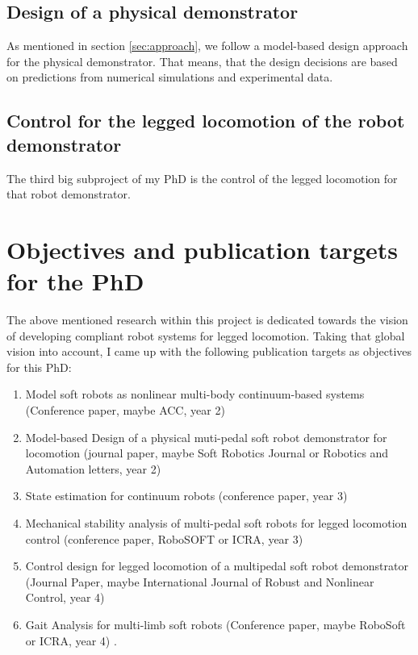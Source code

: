 \subsection*{Design of a physical demonstrator} \label{sub:Design}
%
As mentioned in section \ref{sec:approach}, we follow a model-based design approach for the physical demonstrator. That means, that the design decisions are based on predictions 
from numerical simulations and experimental data. 
%
\subsection*{Control for the legged locomotion of the robot demonstrator} \label{sub:Control}
%
The third big subproject of my PhD is the control of the legged locomotion for that robot demonstrator. 



\section{Objectives and publication targets for the PhD} \label{sec:objectives}
%
The above mentioned research within this project is dedicated towards the vision of developing compliant robot systems for legged locomotion. Taking that global vision into account,
I came up with the following publication targets as objectives for this PhD:

\begin{enumerate}
    \item Model soft robots as nonlinear multi-body continuum-based systems (Conference paper, maybe ACC, year 2) 
    \item Model-based Design of a physical muti-pedal soft robot demonstrator for locomotion  (journal paper, maybe Soft Robotics Journal or Robotics and Automation letters, year 2)
    \item State estimation for continuum robots (conference paper, year 3)
    \item Mechanical stability analysis of multi-pedal soft robots for legged locomotion control (conference paper, RoboSOFT or ICRA, year 3)
    \item Control design for legged locomotion of a multipedal soft robot demonstrator (Journal Paper, maybe International Journal of Robust and Nonlinear Control, year 4)
    \item Gait Analysis for multi-limb soft robots (Conference paper, maybe RoboSoft or ICRA, year 4) \; .
\end{enumerate}